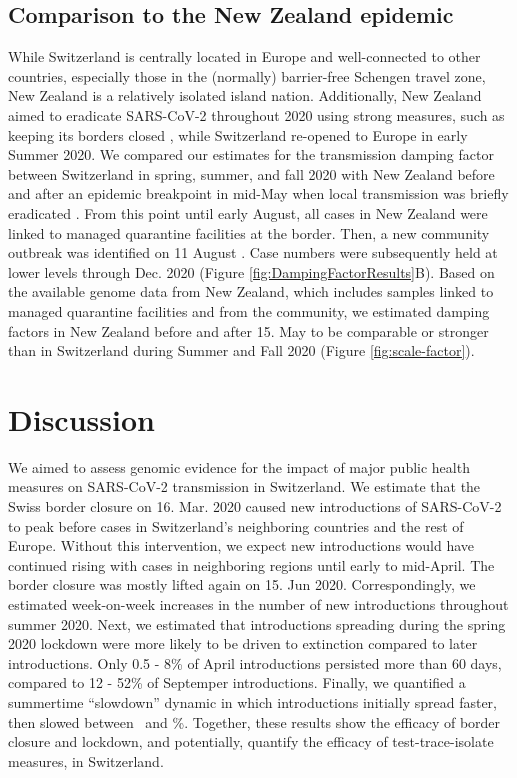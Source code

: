 \documentclass[11pt,twoside,lineno]{pnas-new} %
\begin{document}
\subsection{Comparison to the New Zealand epidemic}
While Switzerland is centrally located in Europe and well-connected to other countries, especially those in the (normally) barrier-free Schengen travel zone, New Zealand is a relatively isolated island nation. Additionally, New Zealand aimed to eradicate SARS-CoV-2 throughout 2020 using strong measures, such as keeping its borders closed \cite{ZL-covid-policies}, while Switzerland re-opened to Europe in early Summer 2020. We compared our estimates for the transmission damping factor between Switzerland in spring, summer, and fall 2020 with New Zealand before and after an epidemic breakpoint in mid-May when local transmission was briefly eradicated \cite{Geoghegan2020}. From this point until early August, all cases in New Zealand were linked to managed quarantine facilities at the border. Then, a new community outbreak was identified on 11 August \cite{Geoghegan2021-nzl-outbreak}. Case numbers were subsequently held at lower levels through Dec. 2020 (Figure \ref{fig:DampingFactorResults}B). Based on the available genome data from New Zealand, which includes samples linked to managed quarantine facilities and from the community, we estimated damping factors in New Zealand before and after 15. May to be comparable or stronger than in Switzerland during Summer and Fall 2020 (Figure \ref{fig:scale-factor}).

\section{Discussion}
We aimed to assess genomic evidence for the impact of major public health measures on SARS-CoV-2 transmission in Switzerland. We estimate that the Swiss border closure on 16. Mar. 2020 caused new introductions of SARS-CoV-2 to peak before cases in Switzerland's neighboring countries and the rest of Europe. Without this intervention, we  expect new introductions would have continued rising with cases in neighboring regions until early to mid-April. The border closure was mostly lifted again on 15. Jun 2020. Correspondingly, we estimated week-on-week increases in the number of new introductions throughout summer 2020. Next, we estimated that introductions spreading during the spring 2020 lockdown were more likely to be driven to extinction compared to later introductions. Only 0.5 - 8\% of April introductions persisted more than 60 days, compared to 12 - 52\% of Septemper introductions. Finally, we quantified a summertime ``slowdown'' dynamic in which introductions initially spread faster, then slowed between \summermaxdampingpercentmedianCHEnosampUB\ and \summermindampingpercentmedianCHEnosampUB \%. Together, these results show the efficacy of border closure and lockdown, and potentially, quantify the efficacy of test-trace-isolate measures, in Switzerland.
\end{document}
